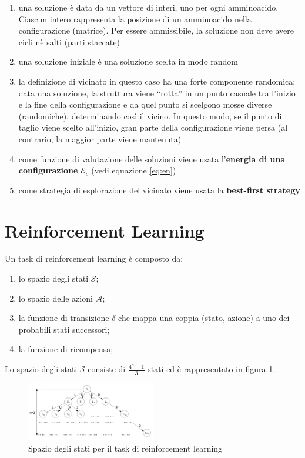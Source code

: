 \documentclass[conference]{IEEEtran}
\begin{document}
\begin{enumerate}
 \item una soluzione è data da un vettore di interi, uno per ogni amminoacido. Ciascun intero rappresenta la posizione di un amminoacido nella configurazione (matrice). Per essere ammissibile, la soluzione non deve avere cicli nè salti (parti staccate)
 \item una soluzione iniziale è una soluzione scelta in modo random
 \item la definizione di vicinato in questo caso ha una forte componente randomica: data una soluzione, la struttura viene ``rotta'' in un punto casuale tra l'inizio e la fine della configurazione e da quel punto si scelgono mosse diverse (randomiche), determinando così il vicino. In questo modo, se il punto di taglio viene scelto all'inizio, gran parte della configurazione viene persa (al contrario, la maggior parte viene mantenuta)
 \item come funzione di valutazione delle soluzioni viene usata l'\textbf{energia di una configurazione} $\mathcal{E}_c$ (vedi equazione \ref{eq:en})
 \item come strategia di esplorazione del vicinato viene usata la \textbf{best-first strategy}
\end{enumerate}

\section{Reinforcement Learning}

Un task di reinforcement learning è composto da:

\begin{enumerate}
 \item lo spazio degli stati $\mathcal{S}$;
 \item lo spazio delle azioni $\mathcal{A}$;
 \item la funzione di transizione $\delta$ che mappa una coppia (stato, azione) a uno dei probabili stati successori;
 \item la funzione di ricompensa;
\end{enumerate}

Lo spazio degli stati $\mathcal{S}$ consiste di $\frac{4^n - 1}{3}$ stati ed è rappresentato in figura \ref{fig:stateSpace}.

\begin{figure}[h]
\centering
\includegraphics[width=0.5\textwidth]{figure/stateSpace.png}
\caption{Spazio degli stati per il task di reinforcement learning}
\label{fig:stateSpace}
\end{figure}
\end{document}
